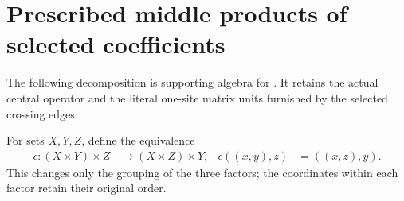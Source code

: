 \section{Prescribed middle products of selected coefficients}

The following decomposition is supporting algebra for
\cite[Proposition~5.7]{Arad2016RigorousRG}.
It retains the actual central operator and the literal one-site matrix
units furnished by the selected crossing edges.

\begin{definition}
    \label{def:selected_exterior_middle_equiv}
    \leanok
    For sets $X,Y,Z$, define the equivalence
    \begin{align}
        \epsilon:(X\times Y)\times Z & \longrightarrow(X\times Z)\times Y, &
        \epsilon((x,y),z)            & =((x,z),y).
        \label{eq:selected_exterior_middle_equiv}
    \end{align}
    This changes only the grouping of the three factors; the coordinates
    within each factor retain their original order.
\end{definition}

